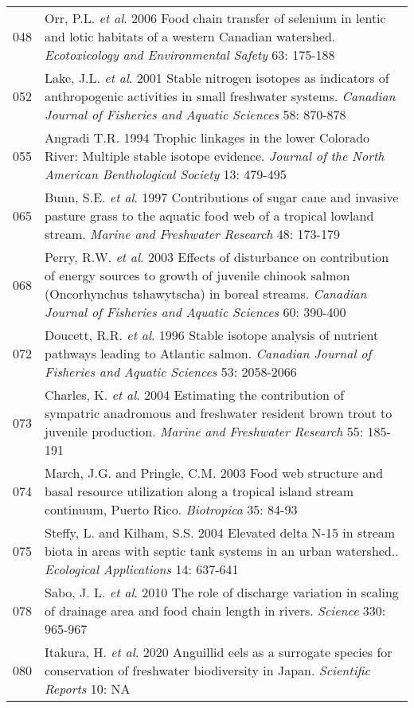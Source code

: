\begin{longtable}{p{}p{}}
  048 & Orr, P.L. \textit{et al}. 2006 Food chain transfer of selenium in lentic and lotic habitats of a western Canadian watershed. \textit{Ecotoxicology and Environmental Safety} 63: 175-188 \\ 
  052 & Lake, J.L. \textit{et al}. 2001 Stable nitrogen isotopes as indicators of anthropogenic activities in small freshwater systems. \textit{Canadian Journal of Fisheries and Aquatic Sciences} 58: 870-878 \\ 
  055 & Angradi T.R. 1994 Trophic linkages in the lower Colorado River: Multiple stable isotope evidence. \textit{Journal of the North American Benthological Society} 13: 479-495 \\ 
  065 & Bunn, S.E. \textit{et al}. 1997 Contributions of sugar cane and invasive pasture grass to the aquatic food web of a tropical lowland stream. \textit{Marine and Freshwater Research} 48: 173-179 \\ 
  068 & Perry, R.W. \textit{et al}. 2003 Effects of disturbance on contribution of energy sources to growth of juvenile chinook salmon (Oncorhynchus tshawytscha) in boreal streams. \textit{Canadian Journal of Fisheries and Aquatic Sciences} 60: 390-400 \\ 
  072 & Doucett, R.R. \textit{et al}. 1996 Stable isotope analysis of nutrient pathways leading to Atlantic salmon. \textit{Canadian Journal of Fisheries and Aquatic Sciences} 53: 2058-2066 \\ 
  073 & Charles, K. \textit{et al}. 2004 Estimating the contribution of sympatric anadromous and freshwater resident brown trout to juvenile production. \textit{Marine and Freshwater Research} 55: 185-191 \\ 
  074 & March, J.G. and Pringle, C.M. 2003 Food web structure and basal resource utilization along a tropical island stream continuum, Puerto Rico. \textit{Biotropica} 35: 84-93 \\ 
  075 & Steffy, L. and Kilham, S.S. 2004 Elevated delta N-15 in stream biota in areas with septic tank systems in an urban watershed.. \textit{Ecological Applications} 14: 637-641 \\ 
  078 & Sabo, J. L. \textit{et al}. 2010 The role of discharge variation in scaling of drainage area and food chain length in rivers. \textit{Science} 330: 965-967 \\ 
  080 & Itakura, H. \textit{et al}. 2020 Anguillid eels as a surrogate species for conservation of freshwater biodiversity in Japan. \textit{Scientific Reports} 10: NA \\ 

\end{longtable}
